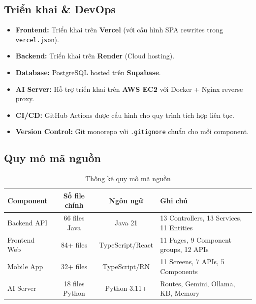 \documentclass[12pt,a4paper]{article}
\begin{document}
\subsection{Triển khai \& DevOps}
\begin{itemize}
    \item \textbf{Frontend:} Triển khai trên \textbf{Vercel} (với cấu hình SPA rewrites trong \texttt{vercel.json}).
    \item \textbf{Backend:} Triển khai trên \textbf{Render} (Cloud hosting).
    \item \textbf{Database:} PostgreSQL hosted trên \textbf{Supabase}.
    \item \textbf{AI Server:} Hỗ trợ triển khai trên \textbf{AWS EC2} với Docker + Nginx reverse proxy.
    \item \textbf{CI/CD:} GitHub Actions được cấu hình cho quy trình tích hợp liên tục.
    \item \textbf{Version Control:} Git monorepo với \texttt{.gitignore} chuẩn cho mỗi component.
\end{itemize}

\subsection{Quy mô mã nguồn}
\begin{table}[h!]
\centering
\begin{tabular}{|l|c|c|l|}
\hline
\textbf{Component} & \textbf{Số file chính} & \textbf{Ngôn ngữ} & \textbf{Ghi chú} \\
\hline
Backend API & 66 files Java & Java 21 & 13 Controllers, 13 Services, 11 Entities \\
\hline
Frontend Web & 84+ files & TypeScript/React & 11 Pages, 9 Component groups, 12 APIs \\
\hline
Mobile App & 32+ files & TypeScript/RN & 11 Screens, 7 APIs, 5 Components \\
\hline
AI Server & 18 files Python & Python 3.11+ & Routes, Gemini, Ollama, KB, Memory \\
\hline
\end{tabular}
\caption{Thống kê quy mô mã nguồn}
\end{table}

\end{document}
